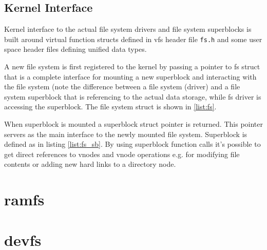 \section{Kernel Interface}

Kernel interface to the actual file system drivers and file system superblocks
is built around virtual function structs defined in \acs{vfs} header file
\verb+fs.h+ and some user space header files defining unified data types.

A new file system is first registered to the kernel by passing a pointer to
fs struct that is a complete interface for mounting a new superblock and
interacting with the file system (note the difference between a file system
(driver) and a file system superblock that is referencing to the actual data
storage, while fs driver is accessing the superblock. The file system struct
is shown in \ref{list:fs}.

When superblock is mounted a superblock struct pointer is returned. This pointer
servers as the main interface to the newly mounted file system. Superblock is
defined as in listing \ref{list:fs_sb}. By using superblock function calls it's
possible to get direct references to vnodes and \acs{vnode} operations e.g. for
modifying file contents or adding new hard links to a directory node.




\chapter{ramfs}


\chapter{devfs}


